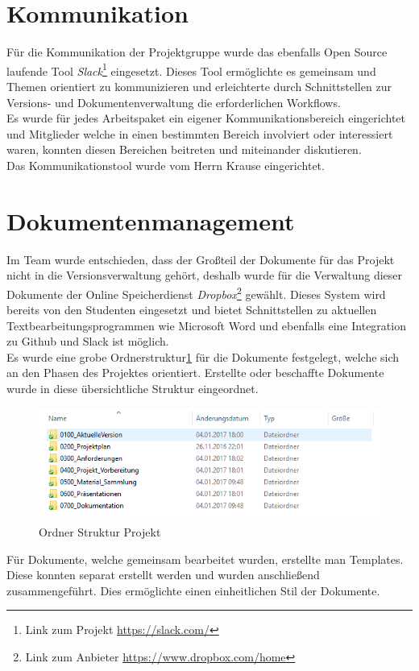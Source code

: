 \section{Kommunikation}
Für die Kommunikation der Projektgruppe wurde das ebenfalls Open Source laufende Tool \textit{Slack}\footnote{Link zum Projekt \url{https://slack.com/}} eingesetzt. Dieses Tool ermöglichte es gemeinsam und Themen orientiert zu kommunizieren und erleichterte durch Schnittstellen zur Versions- und Dokumentenverwaltung die erforderlichen Workflows.\\
Es wurde für jedes Arbeitspaket ein eigener Kommunikationsbereich eingerichtet und Mitglieder welche in einen bestimmten Bereich involviert oder interessiert waren, konnten diesen Bereichen beitreten und miteinander diskutieren.\\
Das Kommunikationstool wurde vom Herrn Krause eingerichtet.

\section{Dokumentenmanagement}
Im Team wurde entschieden, dass der Großteil der Dokumente für das Projekt nicht in die Versionsverwaltung gehört, deshalb wurde für die Verwaltung dieser Dokumente der Online Speicherdienst \textit{Dropbox}\footnote{Link zum Anbieter \url{https://www.dropbox.com/home}} gewählt. Dieses System wird bereits von den Studenten eingesetzt und bietet Schnittstellen zu aktuellen Textbearbeitungsprogrammen wie Microsoft Word und ebenfalls eine Integration zu Github und Slack ist möglich.\\
Es wurde eine grobe Ordnerstruktur\ref{fig:folderStruct} für die Dokumente festgelegt, welche sich an den Phasen des Projektes orientiert. Erstellte oder beschaffte Dokumente wurde in diese übersichtliche Struktur eingeordnet.\\
\begin{figure}[h]
\includegraphics[scale=1]{projectdefinition/Bilder/FolderStructure}
\caption{Ordner Struktur Projekt}
\label{fig:folderStruct}
\end{figure}
Für Dokumente, welche gemeinsam bearbeitet wurden, erstellte man Templates. Diese konnten separat erstellt werden und wurden anschließend zusammengeführt. Dies ermöglichte einen einheitlichen Stil der Dokumente.
